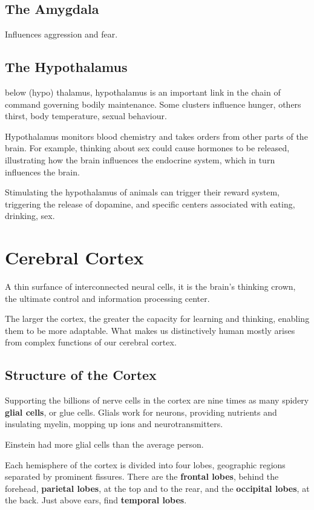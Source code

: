 \subsection{The Amygdala}
Influences aggression and fear.

\subsection{The Hypothalamus}
below (hypo) thalamus, hypothalamus is an important link in the chain of command governing bodily maintenance. Some clusters influence hunger, others thirst, body temperature, sexual behaviour.

Hypothalamus monitors blood chemistry and takes orders from other parts of the brain. For example, thinking about sex could cause hormones to be released, illustrating how the brain influences the endocrine system, which in turn influences the brain.

Stimulating the hypothalamus of animals can trigger their reward system, triggering the release of dopamine, and specific centers associated with eating, drinking, sex.

\section*{Cerebral Cortex}
A thin surfance of interconnected neural cells, it is the brain's thinking crown, the ultimate control and information processing center. 

The larger the cortex, the greater the capacity for learning and thinking, enabling them to be more adaptable. What makes us distinctively human mostly arises from complex functions of our cerebral cortex.

\subsection*{Structure of the Cortex}
Supporting the billions of nerve cells in the cortex are nine times as many spidery \textbf{glial cells}, or glue cells. Glials work for neurons, providing nutrients and insulating myelin, mopping up ions and neurotransmitters.

Einstein had more glial cells than the average person.

Each hemisphere of the cortex is divided into four lobes, geographic regions separated by prominent fissures. There are the \textbf{frontal lobes}, behind the forehead, \textbf{parietal lobes}, at the top and to the rear, and the \textbf{occipital lobes}, at the back. Just above ears, find \textbf{temporal lobes}. 

